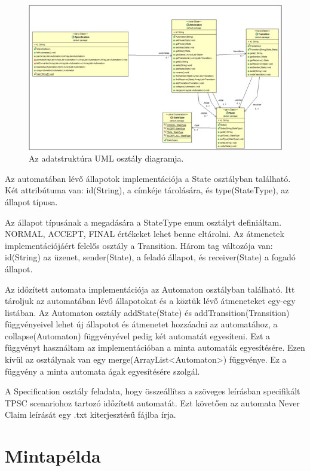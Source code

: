 \begin{figure}[h!]
    \centering
    \includegraphics[width=150mm, keepaspectratio]{figures/13abra.png}
    \caption{Az adatstruktúra UML osztály diagramja.}
\end{figure}

Az automatában lévő állapotok implementációja a State osztályban található.
Két attribútuma van: id(String), a címkéje tárolására, és type(StateType), az állapot típusa.

Az állapot típusának a megadására a StateType enum osztályt definiáltam.
NORMAL, ACCEPT, FINAL értékeket lehet benne eltárolni.
Az átmenetek implementációjáért felelős osztály a Transition.
Három tag változója van: id(String) az üzenet, sender(State), a feladó állapot, és receiver(State) a fogadó állapot.

Az időzített automata implementációja az Automaton osztályban található.
Itt tároljuk az automatában lévő állapotokat és a köztük lévő átmeneteket egy-egy listában.
Az Automaton osztály addState(State) és addTransition(Transition) függvényeivel lehet új állapotot és átmenetet hozzáadni az automatához, a collapse(Automaton) függvényével pedig két automatát egyesíteni.
Ezt a függvényt használtam az implementációban a minta automaták egyesítésére.
Ezen kívül az osztálynak van egy merge(ArrayList<Automaton>) függvénye.
Ez a függvény a minta automata ágak egyesítésére szolgál.

A Specification osztály feladata, hogy összeállítsa a szöveges leírásban specifikált TPSC scenariohoz tartozó időzített automatát.
Ezt követően az automata Never Claim leírását egy .txt kiterjesztésű fájlba írja.

\section{Mintapélda}

